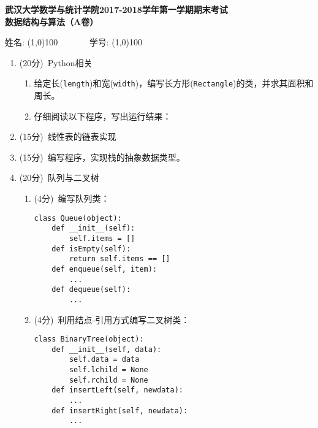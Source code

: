 \documentclass[8pt]{article}
\newlength{\la}
\newlength{\lc}
\newlength{\ld}
\begin{document}
\begin{CJK}{UTF8}{gkai}
\begin{center}
{\Large \bf  武汉大学数学与统计学院2017-2018学年第一学期期末考试\\[0.1in]
  数据结构与算法（A卷）} \vspace{0.1in}

姓名: \line(1,0){100} ~~~~~~ 学号: \line(1,0){100}

\end{center}


\begin{enumerate} %
\item (20分)~Python相关
  \begin{enumerate}
  \item 给定长(\lstinline{length})和宽(\lstinline{width})，编写长方形(\lstinline{Rectangle})的类，并求其面积和周长。
  \item 仔细阅读以下程序，写出运行结果：
    
  \end{enumerate}
\item (15分)~线性表的链表实现
\item (15分)~编写程序，实现栈的抽象数据类型。
\item (20分)~队列与二叉树
  \begin{enumerate}
  \item (4分)~编写队列类：
    \begin{lstlisting}
class Queue(object):
    def __init__(self):
        self.items = []
    def isEmpty(self):
        return self.items == []
    def enqueue(self, item):
        ...
    def dequeue(self):
        ...
    \end{lstlisting}
  \item (4分)~利用结点-引用方式编写二叉树类：
    \begin{lstlisting}
class BinaryTree(object):
    def __init__(self, data):
        self.data = data
        self.lchild = None
        self.rchild = None
    def insertLeft(self, newdata):
        ...
    def insertRight(self, newdata):
        ...    
      \end{lstlisting}
      

\end{enumerate}
\end{enumerate}
\end{CJK}
\end{document}
